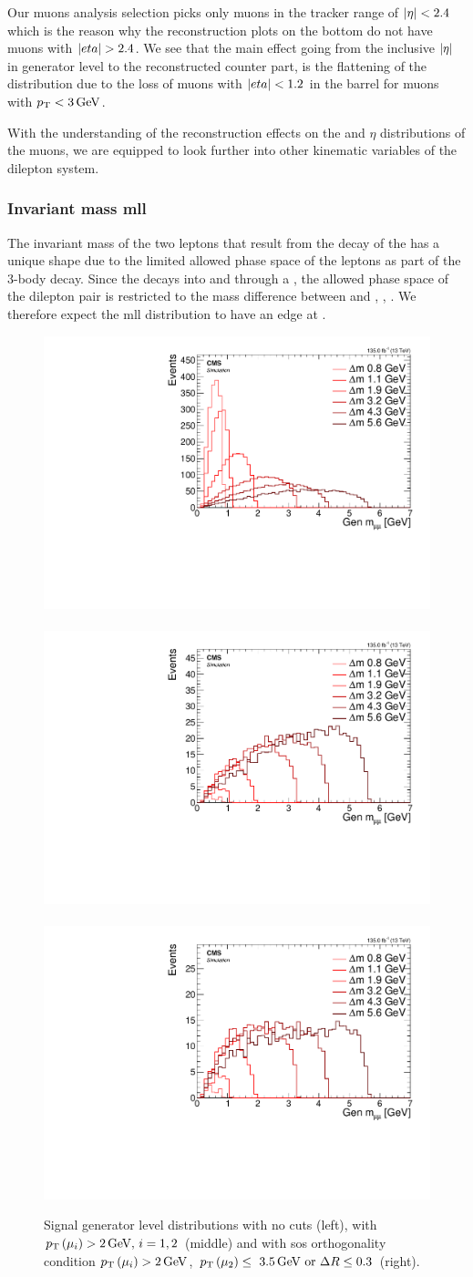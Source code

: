Our muons analysis selection picks only muons in the tracker range of $\lvert \eta \rvert<2.4$ which is the reason why the reconstruction plots on the bottom do not have muons with $\lvert eta \rvert>2.4$. We see that the main effect going from the inclusive $\lvert \eta \rvert$ in generator level to the reconstructed counter part, is the flattening of the distribution due to the loss of muons with $\lvert eta \rvert<1.2$ in the barrel for muons with $p_{\mathrm{T}}<3\,\text{Ge\hspace{-.08em}V}$.

With the understanding of the reconstruction effects on the \pt and $\eta$ distributions of the muons, we are equipped to look further into other kinematic variables of the dilepton system.

\subsubsection{Invariant mass \gls{mll}}
\label{sec:gen-invariant-mass}

The invariant mass of the two leptons that result from the decay of the \neutt has a unique shape due to the limited allowed phase space of the leptons as part of the 3-body decay. Since the \neutt decays into \neuto and \ellell through a \PZstar, the allowed phase space of the dilepton pair is restricted to the mass difference between \neutt and \neuto, \ie, \dm. We therefore expect the \gls{mll} distribution to have an edge at \dm.

\begin{figure}[h]
\centering
\includegraphics[width=0.32\linewidth]{plots/signal_muons_gen/none_gen_invMass.pdf} \,
\includegraphics[width=0.32\linewidth]{plots/signal_muons_gen/none_gen_invMass_cut.pdf}  \,
\includegraphics[width=0.32\linewidth]{plots/signal_muons_gen/none_gen_invMass_orth.pdf} \\
\caption[Signal generator level \mll distributions]{ Signal generator level \mll distributions with no cuts (left), with $p_{\mathrm{T}}\left(\mu_i\right)>2\,\text{Ge\hspace{-.08em}V},\,i=1,2$ (middle) and with \gls{sos} orthogonality condition $p_{\mathrm{T}}\left(\mu_i\right)>2\,\text{Ge\hspace{-.08em}V}$, $p_{\mathrm{T}}\left(\mu_2\right)\leq~3.5\,\text{Ge\hspace{-.08em}V}\text{ or }\Delta R\leq 0.3$ (right).}
\label{fig:signal-generator-mll}
\end{figure}

